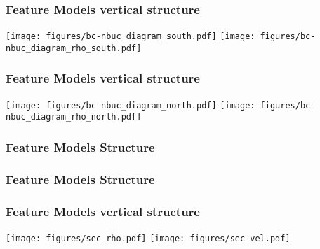 \documentclass{beamer}
\begin{document}
\frame
{
  \frametitle{Feature Models vertical structure}
\begin{center}
\texttt{[image: figures/bc-nbuc\_diagram\_south.pdf]}
\texttt{[image: figures/bc-nbuc\_diagram\_rho\_south.pdf]}

\end{center}
}


\frame
{
  \frametitle{Feature Models vertical structure}
\begin{center}
\texttt{[image: figures/bc-nbuc\_diagram\_north.pdf]}
\texttt{[image: figures/bc-nbuc\_diagram\_rho\_north.pdf]}
\end{center}
}

\frame
{
  \frametitle{Feature Models Structure}
\begin{center}
\end{center}
}

\frame
{
  \frametitle{Feature Models Structure}
\begin{center}
\end{center}
}

\frame
{
  \frametitle{Feature Models vertical structure}
\begin{center}
\texttt{[image: figures/sec\_rho.pdf]}
\texttt{[image: figures/sec\_vel.pdf]}
\end{center}
}

\end{document}
